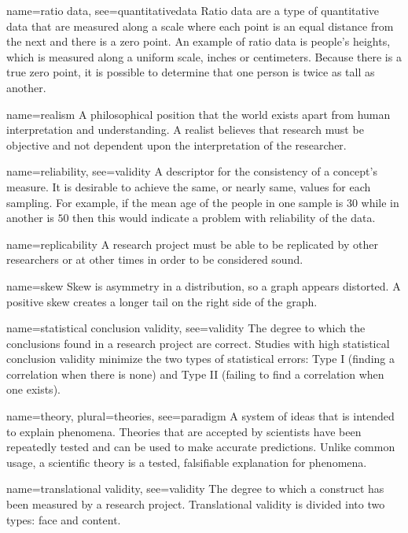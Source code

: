 {name={ratio data},
	see={quantitativedata}}
{%
	Ratio data are a type of quantitative data that are measured along a scale where each point is an equal distance from the next and there is a zero point. An example of ratio data is people's heights, which is measured along a uniform scale, \eg inches or centimeters. Because there is a true zero point, it is possible to determine that one person is twice as tall as another.
}

{name={realism}}
{%
	A philosophical position that the world exists apart from human interpretation and understanding. A realist believes that research must be objective and not dependent upon the interpretation of the researcher.
}

	{name={reliability},
	 see={validity}}
	{%
		A descriptor for the consistency of a concept's measure. It is desirable to achieve the same, or nearly same, values for each sampling. For example, if the mean age of the people in one sample is $ 30 $ while in another is $ 50 $ then this would indicate a problem with reliability of the data.
	}

{name={replicability}}
{%
	A research project must be able to be replicated by other researchers or at other times in order to be considered sound.
}


{name={skew}}
{%
	Skew is asymmetry in a distribution, so a graph appears distorted. A positive skew creates a longer tail on the right side of the graph.
}

{name={statistical conclusion validity},
	see={validity}}
{%
	The degree to which the conclusions found in a research project are correct. Studies with high statistical conclusion validity minimize the two types of statistical errors: Type I (finding a correlation when there is none) and Type II (failing to find a correlation when one exists). 
}

{name={theory},
	plural={theories},
	see={paradigm}}
{%
	A system of ideas that is intended to explain phenomena. Theories that are accepted by scientists have been repeatedly tested and can be used to make accurate predictions. Unlike common usage, a scientific theory is a tested, falsifiable explanation for phenomena.
}

{name={translational validity},
	see={validity}}
{%
	The degree to which a construct has been measured by a research project. Translational validity is divided into two types: face and content.
}

